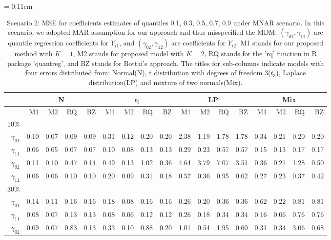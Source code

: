 \documentclass[useAMS,usenatbib,referee]{biom}
\begin{document}
  \begin{table}
\centering
    \caption{Scenario 2: MSE for coefficients estimates of quantiles 0.1, 0.3, 0.5, 0.7, 0.9 under MNAR scenario.
In this scenario, we adopted MAR assumption for our approach and thus misspecified the MDM.
$(\gamma_{01}, \gamma_{11})$ are quantile regression coefficients for $Y_{i1}$, and $(\gamma_{02}, \gamma_{12})$ are coefficients for $Y_{i2}$. M1 stands for our proposed method with $K = 1$, M2 stands for proposed model with $K = 2$, RQ stands for the 'rq' function in R package 'quantreg', and BZ stands for Bottai's approach.
The titles for sub-columns indicate models with four errors distributed from: Normal(N), t distribution with degrees of freedom 3($t_3$),
Laplace distribution(LP) and mixture of two normals(Mix).
}\label{tab:sim2}
    \vspace{10pt} \tabcolsep = 0.11cm
    \begin{tabular}{rrrrrrrrrrrrrrrrr}
      \hline
              & \multicolumn{4}{c}{N} & \multicolumn{4}{c}{$t_3$}   & \multicolumn{4}{c}{LP}   & \multicolumn{4}{c}{Mix}   \\
      \hline
           & M1                      & M2 & RQ & BZ   & M1                      & M2 & RQ & BZ   & M1                      & M2 & RQ & BZ   & M1                      & M2 & RQ & BZ \\
10\%  \\
$\gamma_{01}$ & 0.10 & 0.07 & 0.09 & 0.09 & 0.31 & 0.12 & 0.20 & 0.20 & 2.38 & 1.19 & 1.78 & 1.78 & 0.34 & 0.21 & 0.20 & 0.20 \\
$\gamma_{11}$ & 0.06 & 0.05 & 0.07 & 0.07 & 0.10 & 0.08 & 0.13 & 0.13 & 0.29 & 0.23 & 0.57 & 0.57 & 0.15 & 0.13 & 0.17 & 0.17 \\
$\gamma_{02}$ & 0.11 & 0.10 & 0.47 & 0.14 & 0.49 & 0.13 & 1.02 & 0.36 & 4.64 & 3.79 & 7.07 & 3.51 & 0.36 & 0.21 & 1.28 & 0.50 \\
$\gamma_{12}$ & 0.06 & 0.06 & 0.10 & 0.10 & 0.20 & 0.09 & 0.31 & 0.18 & 0.57 & 0.36 & 0.95 & 0.62 & 0.27 & 0.23 & 0.37 & 0.42 \\
30\% \\
$\gamma_{01}$ & 0.14 & 0.11 & 0.16 & 0.16 & 0.18 & 0.08 & 0.16 & 0.16 & 0.26 & 0.20 & 0.36 & 0.36 & 0.62 & 0.22 & 0.81 & 0.81 \\
$\gamma_{11}$ & 0.08 & 0.07 & 0.13 & 0.13 & 0.08 & 0.06 & 0.12 & 0.12 & 0.26 & 0.18 & 0.34 & 0.34 & 0.16 & 0.06 & 0.76 & 0.76 \\
$\gamma_{02}$ & 0.09 & 0.07 & 0.83 & 0.13 & 0.33 & 0.10 & 0.88 & 0.20 & 1.01 & 0.54 & 1.95 & 0.60 & 0.31 & 0.34 & 3.06 & 0.68 \\

\end{tabular}
\end{table}
\end{document}
